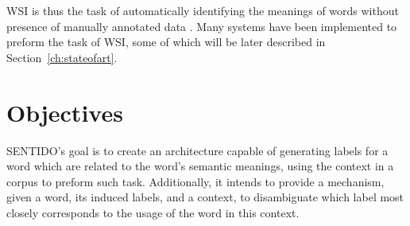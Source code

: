 \ac{WSI} is thus the task of automatically identifying the meanings of words
without presence of manually annotated data \cite{agirre2007semeval}. Many
systems have been implemented to preform the task of \ac{WSI}, some of which
will be later described in Section~\ref{ch:stateofart}.

\section{Objectives}

\ac{SENTIDO}'s goal is to create an architecture capable of generating
labels for a word which are related to the word's semantic meanings, using the
context in a corpus to preform such task. Additionally, it intends to provide a
mechanism, given a word, its induced labels, and a context, to disambiguate
which label most closely corresponds to the usage of the word in this context.


